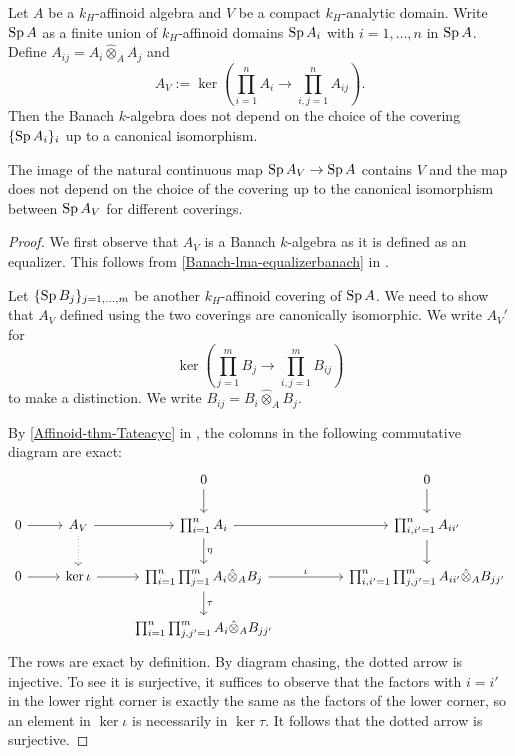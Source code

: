 \begin{lemma}\label{lma-compactanalyticdomainring}
    Let $A$ be a $k_H$-affinoid algebra and $V$ be a compact $k_H$-analytic domain. Write $\operatorname{Sp} A$ as a finite union of $k_H$-affinoid domains $\operatorname{Sp} A_i$ with $i=1,\ldots,n$ in $\operatorname{Sp} A$. Define $A_{ij}=A_i\hat{\otimes}_A A_j$ and 
    \[
        A_V:=\ker  \left( \prod_{i=1}^n A_i \rightarrow \prod_{i,j=1}^n A_{ij}\right).
    \]
    Then the Banach $k$-algebra does not depend on the choice of the covering $\{\operatorname{Sp} A_i\}_i$ up to a canonical isomorphism.

    The image of the natural continuous map $\operatorname{Sp} A_V\rightarrow \operatorname{Sp} A$ contains $V$ and the map does not depend on the choice of the covering up to the canonical isomorphism between $\operatorname{Sp} A_V$ for different coverings.
\end{lemma}
\begin{proof}
    We first observe that $A_V$ is a Banach $k$-algebra as it is defined as an equalizer. This follows from \cref{Banach-lma-equalizerbanach} in .

    Let $\{\operatorname{Sp} B_j\}_{j=1,\ldots,m}$ be another $k_H$-affinoid covering of $\operatorname{Sp} A$. We need to show that $A_V$ defined using the two coverings are canonically isomorphic. We write $A_V'$ for  
    \[
        \ker  \left( \prod_{j=1}^m B_j \rightarrow \prod_{i,j=1}^m B_{ij}\right)
    \]  
    to make a distinction.
    We write $B_{ij}=B_i\hat{\otimes}_A B_j$. 
    
    By \cref{Affinoid-thm-Tateacyc} in , the colomns in the following commutative diagram are exact:
    \[
        \begin{tikzcd}
            &                                 & 0 \arrow[d]                                                                             &  & 0 \arrow[d]                                                       \\
0 \arrow[r] & A_V \arrow[r] \arrow[d, dotted] & \prod_{i=1}^n A_i \arrow[d,"\eta"] \arrow[rr]                                                  &  & {\prod_{i,i'=1}^n A_{ii'}} \arrow[d]                              \\
0 \arrow[r] & \ker \iota \arrow[r]            & \prod_{i=1}^n\prod_{j=1}^m A_i\hat{\otimes}_A B_j \arrow[d, "\tau"] \arrow[rr, "\iota"] &  & {\prod_{i,i'=1}^n\prod_{j,j'=1}^m A_{ii'}\hat{\otimes}_A B_{jj'}} \\
            &                                 & {\prod_{i=1}^n\prod_{j,j'=1}^m A_i\hat{\otimes}_A B_{jj'}}                              &  &                                                                  
\end{tikzcd}  
    \]
    The rows are exact by definition. By diagram chasing, the dotted arrow is injective. To see it is surjective, it suffices to observe that the factors with $i=i'$ in the lower right corner is exactly the same as the factors of the lower corner, so an element in $\ker \iota$ is necessarily in $\ker \tau$. It follows that the dotted arrow is surjective.


\end{proof}
